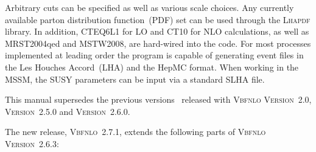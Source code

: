 \documentclass[english,12pt]{article}
\begin{document}
Arbitrary cuts can be specified as well as various scale choices. Any currently
available parton distribution function~(PDF) set can be used through the
\textsc{Lhapdf} library.  In addition, 
CTEQ6L1 for LO and CT10 for NLO calculations, as well as MRST2004qed and MSTW2008, are
hard-wired into the code. For most processes implemented at leading order the
program is capable of generating event files in the Les Houches Accord~(LHA) and the 
HepMC format.  When working in the MSSM, the SUSY parameters can be input via a
standard SLHA file.

This manual supersedes the previous versions~\cite{Arnold:2008rz,Arnold:2011wj,Arnold:2011wjv2} released with
\textsc{Vbfnlo Version~2.0}, \textsc{Version~2.5.0} and \textsc{Version~2.6.0}. 

\noindent The new release, \textsc{Vbfnlo~2.7.1}, extends the following parts of \textsc{Vbfnlo Version~2.6.3}:
\end{document}
